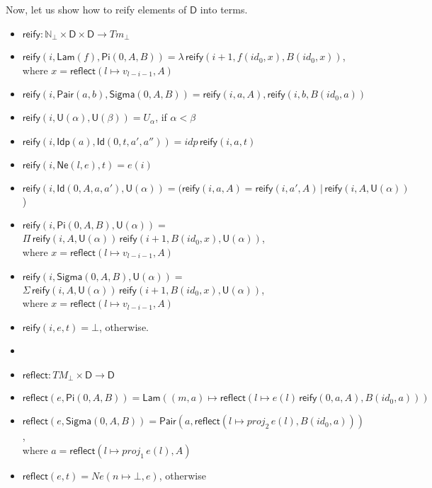 \documentclass{amsart}
\theoremstyle{definition}
\theoremstyle{remark}
\newcommand{\D}{\mathsf{D}}
\newcommand{\nats}{\mathbb{N}}
\numberwithin{table}{section}
\begin{document}
Now, let us show how to reify elements of $\D$ into terms.
\begin{itemize}
\item[] $\mathsf{reify} : \nats_\bot \times \D \times \D \to Tm_\bot$
\item[] $\mathsf{reify}(i, \mathsf{Lam}(f), \mathsf{Pi}(0, A, B)) = \lambda\,\mathsf{reify}(i + 1, f(id_0, x), B(id_0, x))$, \\
        \indent where $x = \mathsf{reflect}(l \mapsto v_{l - i - 1}, A)$
\item[] $\mathsf{reify}(i, \mathsf{Pair}(a, b), \mathsf{Sigma}(0, A, B)) = \mathsf{reify}(i, a, A), \mathsf{reify}(i, b, B(id_0, a))$
\item[] $\mathsf{reify}(i, \mathsf{U}(\alpha), \mathsf{U}(\beta)) = U_\alpha$, if $\alpha < \beta$
\item[] $\mathsf{reify}(i, \mathsf{Idp}(a), \mathsf{Id}(0, t, a', a'')) = idp\,\mathsf{reify}(i, a, t)$
\item[] $\mathsf{reify}(i, \mathsf{Ne}(l, e), t) = e(i)$
\item[] $\mathsf{reify}(i, \mathsf{Id}(0, A, a, a'), \mathsf{U}(\alpha)) = (\mathsf{reify}(i, a, A) = \mathsf{reify}(i, a', A)\,|\,\mathsf{reify}(i, A, \mathsf{U}(\alpha))$)
\item[] $\mathsf{reify}(i, \mathsf{Pi}(0, A, B), \mathsf{U}(\alpha)) =$
        $\Pi\,\mathsf{reify}(i, A, \mathsf{U}(\alpha))\,\mathsf{reify}(i + 1, B(id_0, x), \mathsf{U}(\alpha))$, \\
        \indent where $x = \mathsf{reflect}(l \mapsto v_{l - i - 1}, A)$
\item[] $\mathsf{reify}(i, \mathsf{Sigma}(0, A, B), \mathsf{U}(\alpha)) = $
        $\Sigma\,\mathsf{reify}(i, A, \mathsf{U}(\alpha))\,\mathsf{reify}(i + 1, B(id_0, x), \mathsf{U}(\alpha))$, \\
        \indent where $x = \mathsf{reflect}(l \mapsto v_{l - i - 1}, A)$
\item[] $\mathsf{reify}(i, e, t) = \bot$, otherwise.
\item[]
\item[] $\mathsf{reflect} : TM_\bot \times \D \to \D$
\item[] $\mathsf{reflect}(e,\mathsf{Pi}(0, A, B)) = \mathsf{Lam}((m, a) \mapsto \mathsf{reflect}(l \mapsto e(l)\,\mathsf{reify}(0, a, A), B(id_0, a)))$
\item[] $\mathsf{reflect}(e,\mathsf{Sigma}(0, A, B)) = \mathsf{Pair}(a, \mathsf{reflect}(l \mapsto proj_2\,e(l), B(id_0, a)))$, \\
        \indent where $a = \mathsf{reflect}(l \mapsto proj_1\,e(l), A)$
\item[] $\mathsf{reflect}(e,t) = Ne(n \mapsto \bot, e)$, otherwise
\end{itemize}



\end{document}
